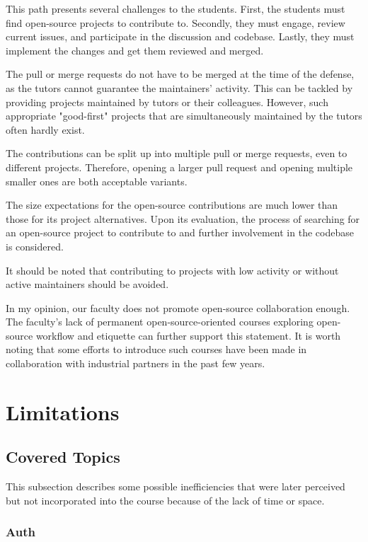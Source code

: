 \documentclass[
  digital,
  color,
  oneside,
  nosansbold,
  nocolorbold,
  lof,
  lot,
]{fithesis4}
\begin{document}
This path presents several challenges to the students. First, the students must find open-source projects to contribute to. Secondly, they must engage, review current issues, and participate in the discussion and codebase. Lastly, they must implement the changes and get them reviewed and merged.

The pull or merge requests do not have to be merged at the time of the defense, as the tutors cannot guarantee the maintainers' activity. This can be tackled by providing projects maintained by tutors or their colleagues. However, such appropriate "good-first" projects that are simultaneously maintained by the tutors often hardly exist.

The contributions can be split up into multiple pull or merge requests, even to different projects. Therefore, opening a larger pull request and opening multiple smaller ones are both acceptable variants.

The size expectations for the open-source contributions are much lower than those for its project alternatives. Upon its evaluation, the process of searching for an open-source project to contribute to and further involvement in the codebase is considered.

It should be noted that contributing to projects with low activity or without active maintainers should be avoided.

In my opinion, our faculty does not promote open-source collaboration enough. The faculty's lack of permanent open-source-oriented courses exploring open-source workflow and etiquette can further support this statement. It is worth noting that some efforts to introduce such courses have been made in collaboration with industrial partners in the past few years.

\section{Limitations}

\subsection{Covered Topics}

This subsection describes some possible inefficiencies that were later perceived but not incorporated into the course because of the lack of time or space.

\subsubsection{Auth}
\end{document}
